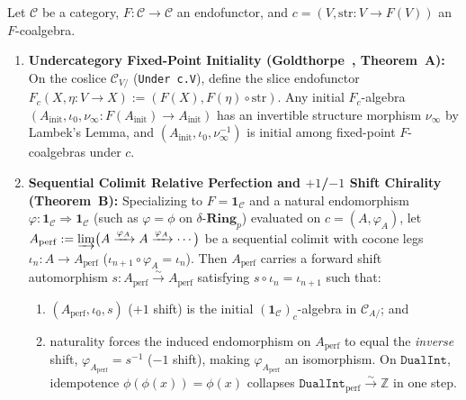 \begin{theorem}\label{thm:slice-perfection-chirality}
%
\leanok%
%
Let $\mathcal{C}$ be a category, $F : \mathcal{C} \to \mathcal{C}$ an endofunctor, and $c = (V, \mathrm{str} : V \to F(V))$ an $F$-coalgebra.
\begin{enumerate}
  \item \textbf{Undercategory Fixed-Point Initiality (Goldthorpe~\cite[Prop.~2.3.13]{Goldthorpe23}, Theorem~A):} On the coslice $\mathcal{C}_{V/}$ (\texttt{Under c.V}), define the slice endofunctor $F_c(X, \eta : V \to X) := (F(X), F(\eta) \circ \mathrm{str})$. Any initial $F_c$-algebra $(A_{\mathrm{init}}, \iota_0, \nu_\infty : F(A_{\mathrm{init}}) \to A_{\mathrm{init}})$ has an invertible structure morphism $\nu_\infty$ by Lambek's Lemma, and $(A_{\mathrm{init}}, \iota_0, \nu_\infty^{-1})$ is initial among fixed-point $F$-coalgebras under $c$.
  \item \textbf{Sequential Colimit Relative Perfection and $+1$/$-1$ Shift Chirality (Theorem~B):} Specializing to $F = \mathbf{1}_{\mathcal{C}}$ and a natural endomorphism $\varphi : \mathbf{1}_{\mathcal{C}} \Rightarrow \mathbf{1}_{\mathcal{C}}$ (such as $\varphi = \phi$ on $\delta\text{-}\mathbf{Ring}_p$) evaluated on $c = (A, \varphi_A)$, let $A_{\mathrm{perf}} := \varinjlim \bigl(A \xrightarrow{\varphi_A} A \xrightarrow{\varphi_A} \cdots\bigr)$ be a sequential colimit with cocone legs $\iota_n : A \to A_{\mathrm{perf}}$ ($\iota_{n+1} \circ \varphi_A = \iota_n$). Then $A_{\mathrm{perf}}$ carries a forward shift automorphism $s : A_{\mathrm{perf}} \xrightarrow{\sim} A_{\mathrm{perf}}$ satisfying $s \circ \iota_n = \iota_{n+1}$ such that:
  \begin{enumerate}
    \item $(A_{\mathrm{perf}}, \iota_0, s)$ ($+1$ shift) is the initial $(\mathbf{1}_{\mathcal{C}})_c$-algebra in $\mathcal{C}_{A/}$; and
    \item naturality forces the induced endomorphism on $A_{\mathrm{perf}}$ to equal the \emph{inverse} shift, $\varphi_{A_{\mathrm{perf}}} = s^{-1}$ ($-1$ shift), making $\varphi_{A_{\mathrm{perf}}}$ an isomorphism. On $\mathtt{DualInt}$, idempotence $\phi(\phi(x)) = \phi(x)$ collapses $\mathtt{DualInt}_{\mathrm{perf}} \xrightarrow{\sim} \mathbb{Z}$ in one step.
  \end{enumerate}
\end{enumerate}
\end{theorem}


